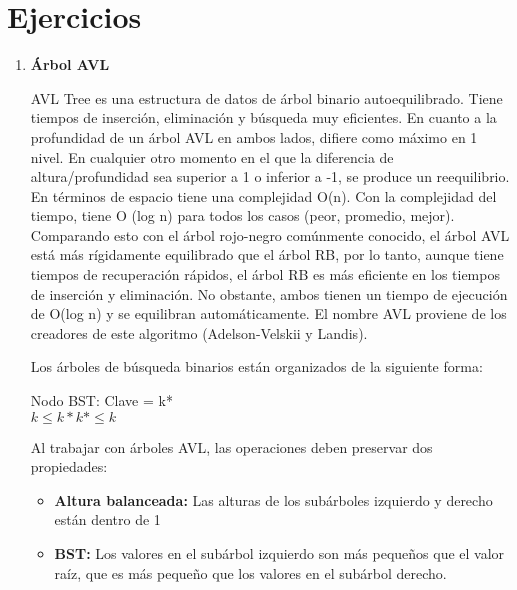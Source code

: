 \documentclass{article}
\begin{document}
	\section{Ejercicios}\label{sec:ejercicios}
	\begin{enumerate}
	
        \item \textbf{Árbol AVL}
            
            AVL Tree es una estructura de datos de árbol binario autoequilibrado. Tiene tiempos de inserción, eliminación y búsqueda muy eficientes. En cuanto a la profundidad de un árbol AVL en ambos lados, difiere como máximo en 1 nivel. En cualquier otro momento en el que la diferencia de altura/profundidad sea superior a 1 o inferior a -1, se produce un reequilibrio. En términos de espacio tiene una complejidad O(n). Con la complejidad del tiempo, tiene O (log n) para todos los casos (peor, promedio, mejor). Comparando esto con el árbol rojo-negro comúnmente conocido, el árbol AVL está más rígidamente equilibrado que el árbol RB, por lo tanto, aunque tiene tiempos de recuperación rápidos, el árbol RB es más eficiente en los tiempos de inserción y eliminación. No obstante, ambos tienen un tiempo de ejecución de O(log n) y se equilibran automáticamente. El nombre AVL proviene de los creadores de este algoritmo (Adelson-Velskii y Landis).\par
		    \vspace{5mm}
		    Los árboles de búsqueda binarios están organizados de la siguiente forma:\par
		    \vspace{5mm}

            \begin{center}
                Nodo BST: Clave = k* \\[\baselineskip]
                ${ k \leq k*   k* \leq k}$
            \end{center}

            Al trabajar con árboles AVL, las operaciones deben preservar dos propiedades:

            \begin{itemize}
                \item \textbf{Altura balanceada: } Las alturas de los subárboles izquierdo y derecho están dentro de 1
                \item \textbf{BST: } Los valores en el subárbol izquierdo son más pequeños que el valor raíz, que es más pequeño que los valores en el subárbol derecho.
            \end{itemize}
            \vspace{5mm}
            

\end{enumerate}
\end{document}
